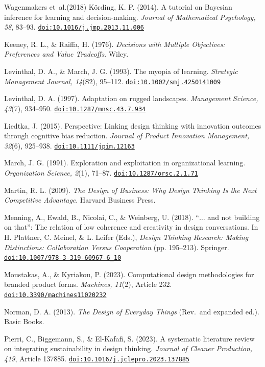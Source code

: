 \documentclass[11pt]{article}
\providecommand{\doi}[1]{\href{https://doi.org/#1}{\nolinkurl{doi:#1}}}
\begin{document}
\begin{thebibliography}{Wagenmakers et~al.(2018)}
 K{\"o}rding, K. P. (2014). A tutorial on Bayesian inference for learning and decision-making. \textit{Journal of Mathematical Psychology, 58}, 83--93. \doi{10.1016/j.jmp.2013.11.006}

 Keeney, R. L., \& Raiffa, H. (1976). \textit{Decisions with Multiple Objectives: Preferences and Value Tradeoffs}. Wiley.

 Levinthal, D. A., \& March, J. G. (1993). The myopia of learning. \textit{Strategic Management Journal, 14}(S2), 95--112. \doi{10.1002/smj.4250141009}

 Levinthal, D. A. (1997). Adaptation on rugged landscapes. \textit{Management Science, 43}(7), 934--950. \doi{10.1287/mnsc.43.7.934}

 Liedtka, J. (2015). Perspective: Linking design thinking with innovation outcomes through cognitive bias reduction. \textit{Journal of Product Innovation Management, 32}(6), 925--938. \doi{10.1111/jpim.12163}

 March, J. G. (1991). Exploration and exploitation in organizational learning. \textit{Organization Science, 2}(1), 71--87. \doi{10.1287/orsc.2.1.71}

 Martin, R. L. (2009). \textit{The Design of Business: Why Design Thinking Is the Next Competitive Advantage}. Harvard Business Press.

 Menning, A., Ewald, B., Nicolai, C., \& Weinberg, U. (2018). ``$\ldots$ and not building on that'': The relation of low coherence and creativity in design conversations. In H. Plattner, C. Meinel, \& L. Leifer (Eds.), \textit{Design Thinking Research: Making Distinctions: Collaboration Versus Cooperation} (pp. 195--213). Springer. \doi{10.1007/978-3-319-60967-6_10}

 Moustakas, A., \& Kyriakou, P. (2023). Computational design methodologies for branded product forms. \textit{Machines, 11}(2), Article 232. \doi{10.3390/machines11020232}

 Norman, D. A. (2013). \textit{The Design of Everyday Things} (Rev.\ and expanded ed.). Basic Books.

 Pierri, C., Biggemann, S., \& El-Kafafi, S. (2023). A systematic literature review on integrating sustainability in design thinking. \textit{Journal of Cleaner Production, 419}, Article 137885. \doi{10.1016/j.jclepro.2023.137885}


\end{thebibliography}
\end{document}
